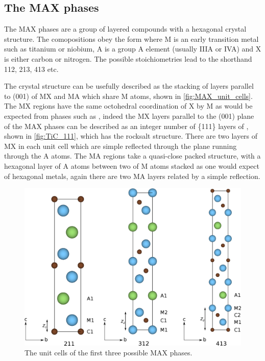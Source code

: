 \subsection{The MAX phases}

The MAX phases are a group of layered compounds with a hexagonal crystal structure. The comopositions obey the form  where M is an early transition metal such as titanium or niobium, A is a group A element (usually IIIA or IVA) and X is either carbon or nitrogen. The possible stoichiometries lead to the shorthand 112, 213, 413 etc.

The crystal structure can be usefully described as the stacking of layers parallel to (001) of MX and MA which share M atoms,  shown in \autoref{fig:MAX_unit_cells}. The MX regions have the same octohedral coordination of X by M as would be expected from phases such as , indeed the MX layers parallel to the (001) plane of the MAX phases can be described as an integer number of \{111\} layers of , shown in \autoref{fig:TiC_111}, which has the rocksalt structure. There are two layers of MX in each unit cell which are simple reflected through the plane running through the A atoms. The MA regions take a quasi-close packed structure, with a hexagonal layer of A atoms between two of M atoms stacked as one would expect of hexagonal metals, again there are two MA layers related by a simple reflection.


\begin{figure}
\centering
\includegraphics[width=\textwidth]{MAX_unit_cells}
\caption{The unit cells of the first three possible MAX phases.\label{fig:MAX_unit_cells}}
\end{figure}





